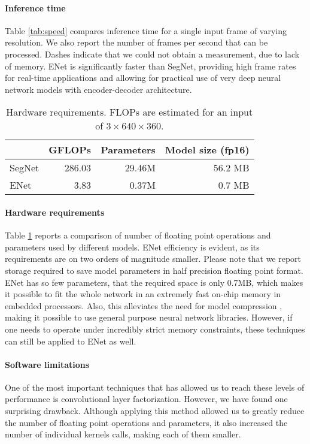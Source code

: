 \documentclass{article}
\begin{document}
\paragraph{Inference time} Table \ref{tab:speed} compares inference time for a single input frame of varying resolution. We also report the number of frames per second that can be processed.
Dashes indicate that we could not obtain a measurement, due to lack of memory.
ENet is significantly faster than SegNet, providing high frame rates for real-time applications and allowing for practical use of very deep neural network models with encoder-decoder architecture.

\begin{table}[htb]
  \caption{Hardware requirements. FLOPs are estimated for an input of $3\times640\times360$.}
  \vspace{0.05in}
  \label{tab:ops}
  \centering
  \begin{tabular}{ l r r r }
    \toprule
    &\multicolumn{1}{c}{GFLOPs} &\multicolumn{1}{c}{Parameters} & \multicolumn{1}{c}{Model size (fp16)}\\
    \midrule
    SegNet      &286.03                    &29.46M             & 56.2 MB\\
    ENet        &3.83                      &0.37M              & 0.7 MB\\
    \bottomrule
  \end{tabular}
\end{table}

\paragraph{Hardware requirements} Table \ref{tab:ops} reports a comparison of number of floating point operations and parameters used by different models.
ENet efficiency is evident, as its requirements are on two orders of magnitude smaller.
Please note that we report storage required to save model parameters in half precision floating point format.
ENet has so few parameters, that the required space is only 0.7MB, which makes it possible to fit the whole network in an extremely fast on-chip memory in embedded processors.
Also, this alleviates the need for model compression \cite{song15}, making it possible to use general purpose neural network libraries.
However, if one needs to operate under incredibly strict memory constraints, these techniques can still be applied to ENet as well.

\paragraph{Software limitations} One of the most important techniques that has allowed us to reach these levels of performance is convolutional layer factorization.
However, we have found one surprising drawback.
Although applying this method allowed us to greatly reduce the number of floating point operations and parameters, it also increased the number of individual kernels calls, making each of them smaller.
\end{document}
